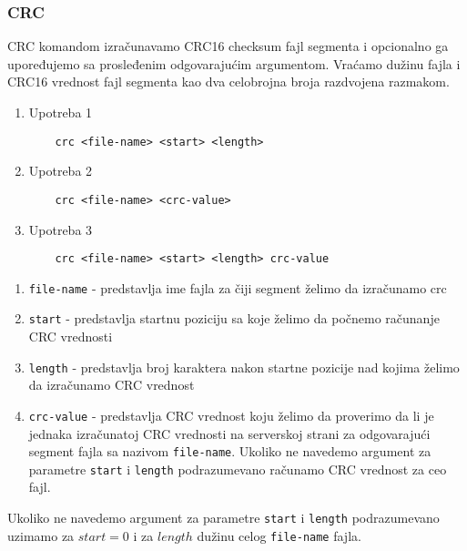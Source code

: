 \documentclass[a4paper]{extarticle}
\begin{document}
\subsubsection{CRC}
CRC komandom izračunavamo CRC16 checksum fajl segmenta i opcionalno ga upoređujemo sa prosleđenim odgovarajućim argumentom.
Vraćamo dužinu fajla i CRC16 vrednost fajl segmenta kao dva celobrojna broja razdvojena razmakom.\\
\begin{enumerate}
	\item Upotreba 1
	\begin{verbatim}
	crc <file-name> <start> <length>
	\end{verbatim}
	\item Upotreba 2
	\begin{verbatim}
	crc <file-name> <crc-value>
	\end{verbatim}
	\item Upotreba 3
	\begin{verbatim}
	crc <file-name> <start> <length> crc-value
	\end{verbatim}
\end{enumerate}


\begin{enumerate}
	\item \verb|file-name| - predstavlja ime fajla za čiji segment želimo da izračunamo crc
	\item \verb|start| - predstavlja startnu poziciju sa koje želimo da počnemo računanje CRC vrednosti
	\item \verb|length| - predstavlja broj karaktera nakon startne pozicije nad kojima želimo da izračunamo CRC vrednost
	\item \verb|crc-value| - predstavlja CRC vrednost koju želimo da proverimo da li je jednaka izračunatoj CRC vrednosti na serverskoj strani za odgovarajući segment fajla sa nazivom \verb|file-name|. Ukoliko ne navedemo argument za parametre \verb|start| i \verb|length| podrazumevano računamo CRC vrednost za ceo fajl.
\end{enumerate}


Ukoliko ne navedemo argument za parametre \verb|start| i \verb|length| podrazumevano uzimamo za $start=0$ i za $length$ dužinu celog \verb|file-name| fajla.
\end{document}
